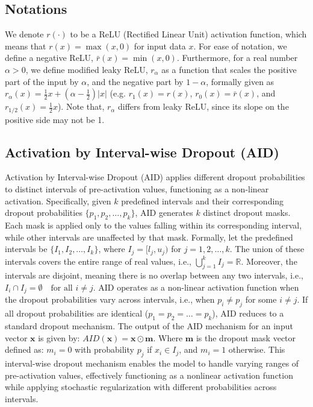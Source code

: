 

\newtheorem{property}{Property} %

\subsection{Notations}
We denote $r(\cdot)$ to be a ReLU (Rectified Linear Unit) activation function, which means that $r(x) = \max(x, 0)$ for input data $x$. For ease of notation, we define a negative ReLU, $\bar r(x) = \min(x,0)$. 
Furthermore, for a real number $\alpha>0$, we define modified leaky ReLU, $r_\alpha$ as a function that scales the positive part of the input by $\alpha$, and the negative part by $1-\alpha$, formally given as $r_\alpha(x) = \frac{1}{2}x+(\alpha-\frac{1}{2})|x|$ (e.g. $r_1(x) = r(x)$, $r_0(x) = \bar r(x)$, and $r_{1/2}(x) = \frac{1}{2}x$). Note that, $r_\alpha$ differs from leaky ReLU, since its slope on the positive side may not be 1.

\subsection{Activation by Interval-wise Dropout (AID)}\label{sec:4.2}

Activation by Interval-wise Dropout (AID) applies different dropout probabilities to distinct intervals of pre-activation values, functioning as a non-linear activation.
Specifically, given \( k \) predefined intervals and their corresponding dropout probabilities \( \{p_1, p_2, \dots, p_k\} \), AID generates \( k \) distinct dropout masks.
Each mask is applied only to the values falling within its corresponding interval, while other intervals are unaffected by that mask.
Formally, let the predefined intervals be \( \{I_1, I_2, \dots, I_k\} \), where \( I_j = [l_j, u_j) \) for \( j = 1, 2, \dots, k \).
The union of these intervals covers the entire range of real values, i.e., \( \bigcup_{j=1}^k I_j = \mathbb{R} \).
Moreover, the intervals are disjoint, meaning there is no overlap between any two intervals, i.e., \( I_i \cap I_j = \emptyset \quad \text{for all } i \neq j \).
AID operates as a non-linear activation function when the dropout probabilities vary across intervals, i.e., when \( p_i \neq p_j \) for some \( i \neq j \).
If all dropout probabilities are identical (\( p_1 = p_2 = \dots = p_k \)), AID reduces to a standard dropout mechanism.
The output of the AID mechanism for an input vector \( \mathbf{x} \) is given by: \(AID(\mathbf{x}) = \mathbf{x} \odot \mathbf{m}\).
Where \( \mathbf{m} \) is the dropout mask vector defined as: 
\( m_i = 0 \) with probability \( p_j \) if \( x_i \in I_j \), and \( m_i = 1 \) otherwise.
This interval-wise dropout mechanism enables the model to handle varying ranges of pre-activation values, effectively functioning as a nonlinear activation function while applying stochastic regularization with different probabilities across intervals.

